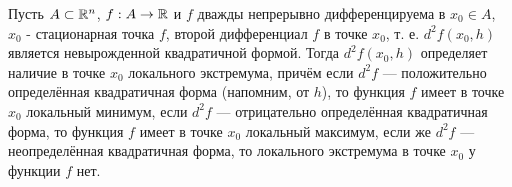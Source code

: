 \begin{teorema}
Пусть $A\subset\mathbb{R}^n$, $f:A \to \mathbb{R}$ и $f$ дважды непрерывно дифференцируема в $x_0\in A$, $x_0$ - стационарная точка $f$,
второй дифференциал $f$ в точке $x_0$, т. е. $d^2 f(x_0,h)$ является невырожденной квадратичной формой.
Тогда $d^2 f(x_0,h)$ определяет наличие в точке $x_0$ локального экстремума, причём если $d^2 f$ --- положительно определённая квадратичная форма (напомним, от $h$), то функция $f$ имеет в точке $x_0$ локальный минимум, если $d^2 f$ --- отрицательно определённая квадратичная форма, то функция $f$ имеет в точке $x_0$ локальный максимум, если же $d^2 f$ --- неопределённая квадратичная форма, то локального экстремума в точке $x_0$ у функции $f$ нет.
\end{teorema}
\dokvo
